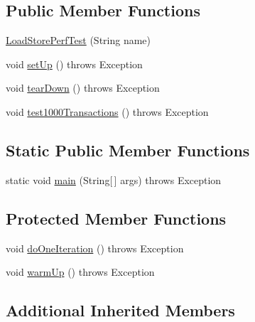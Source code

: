 \subsection*{Public Member Functions}
\begin{DoxyCompactItemize}
\item 
\mbox{\hyperlink{classtestsuite_1_1perf_1_1_load_store_perf_test_afe1fdb0e449dd028376e94eaaa9d9b68}{Load\+Store\+Perf\+Test}} (String name)
\item 
void \mbox{\hyperlink{classtestsuite_1_1perf_1_1_load_store_perf_test_a2c23eb5745202ad5793e966752a87ab7}{set\+Up}} ()  throws Exception 
\item 
void \mbox{\hyperlink{classtestsuite_1_1perf_1_1_load_store_perf_test_a8c9cc35a3ee0fc42720dc2090ec300b5}{tear\+Down}} ()  throws Exception 
\item 
void \mbox{\hyperlink{classtestsuite_1_1perf_1_1_load_store_perf_test_a0092e8eee45c82e1e740f52b0e93cd42}{test1000\+Transactions}} ()  throws Exception 
\end{DoxyCompactItemize}
\subsection*{Static Public Member Functions}
\begin{DoxyCompactItemize}
\item 
static void \mbox{\hyperlink{classtestsuite_1_1perf_1_1_load_store_perf_test_ab6e6a7c9d6a4facf8b8df79d201d8837}{main}} (String\mbox{[}$\,$\mbox{]} args)  throws Exception 
\end{DoxyCompactItemize}
\subsection*{Protected Member Functions}
\begin{DoxyCompactItemize}
\item 
void \mbox{\hyperlink{classtestsuite_1_1perf_1_1_load_store_perf_test_aae53536cc1145eb4860cc71c132f66d8}{do\+One\+Iteration}} ()  throws Exception 
\item 
void \mbox{\hyperlink{classtestsuite_1_1perf_1_1_load_store_perf_test_aedfa3a61f8e71a59e738a6b6e9d27d0e}{warm\+Up}} ()  throws Exception 
\end{DoxyCompactItemize}
\subsection*{Additional Inherited Members}


